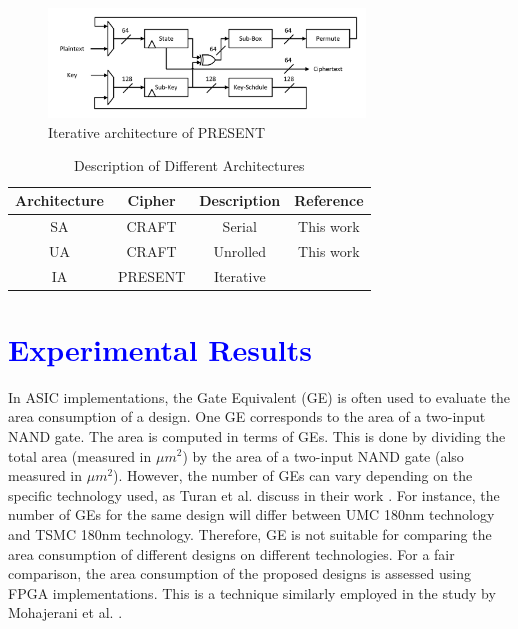 \documentclass[final,5p,times,twocolumn]{elsarticle}
\begin{document}
\begin{figure}
    \centering
    \includegraphics[width=0.75\textwidth]{./fig/iteration-present.pdf}
    \caption{Iterative architecture of PRESENT}\label{fig5}
\end{figure}

\begin{table}[h]
    \centering
    \caption{Description of Different Architectures}\label{tab2}%
    \begin{tabular}{|c|c|c|c|}
        \hline
        Architecture & Cipher  & Description & Reference           \\
        \hline
        SA           & CRAFT   & Serial      & This work           \\
        UA           & CRAFT   & Unrolled    & This work           \\
        IA           & PRESENT & Iterative   & \cite{Bharathi2022} \\
        \hline
    \end{tabular}
\end{table}


\section{\textcolor{blue}{Experimental Results}}\label{sec4}

In ASIC implementations, the Gate Equivalent (GE) is often used to evaluate the area consumption of a design.
One GE corresponds to the area of a two-input NAND gate.
The area is computed in terms of GEs.
This is done by dividing the total area (measured in $\mu m^2$) by the area of a two-input NAND gate (also measured in $\mu m^2$).
However, the number of GEs can vary depending on the specific technology used, as Turan et al. discuss in their work \cite{Turan}.
For instance, the number of GEs for the same design will differ between UMC 180nm technology and TSMC 180nm technology.
Therefore, GE is not suitable for comparing the area consumption of different designs on different technologies.
For a fair comparison, the area consumption of the proposed designs is assessed using FPGA implementations.
This is a technique similarly employed in the study by Mohajerani et al. \cite{Mohajerani2020}.
\end{document}
